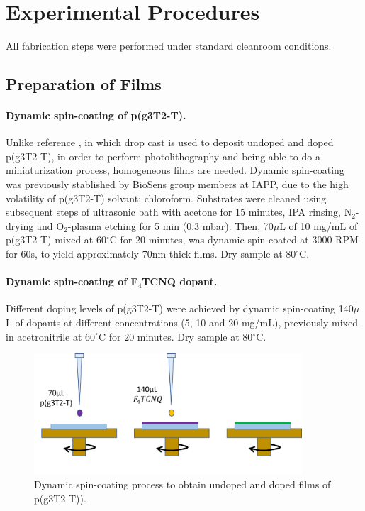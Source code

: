 \section{Experimental Procedures}

All fabrication steps were performed under standard cleanroom conditions.
\subsection{Preparation of Films} \label{subsec:films}
\paragraph{Dynamic spin-coating of p(g3T2-T).}Unlike reference \cite{tanTuningOrganicElectrochemical2022}, in which drop cast is used to deposit undoped and doped p(g3T2-T), in order to perform photolithography and being able to do a miniaturization process, homogeneous films are needed. Dynamic spin-coating was previously stablished by BioSens group members at IAPP, due to the high volatility of p(g3T2-T) solvant: chloroform. Substrates were cleaned using subsequent steps of ultrasonic bath with acetone for 15 minutes, IPA rinsing, N$_{2}$-drying and O$_{2}$-plasma etching for 5 min (0.3 mbar). Then, 70$\mu$L of 10 mg/mL of p(g3T2-T) mixed at 60$^{\circ}$C for 20 minutes, was dynamic-spin-coated at 3000 RPM for 60s, to yield approximately 70nm-thick films. Dry sample at 80$^{\circ}$C.

\paragraph{Dynamic spin-coating of F$_{4}$TCNQ dopant.}Different doping levels of p(g3T2-T) were achieved by dynamic spin-coating 140$\mu$L of dopants at different concentrations (5, 10 and 20 mg/mL), previously mixed in acetronitrile at $60^{\circ}$C for 20 minutes. Dry sample at 80$^{\circ}$C.

\begin{figure}[ht]
  \centering
  \includegraphics[width=10cm]{Images/pdf/spin_coating.pdf}
  \caption{Dynamic spin-coating process to obtain undoped and doped films of p(g3T2-T)).}
  \label{fig:coating}
\end{figure}

